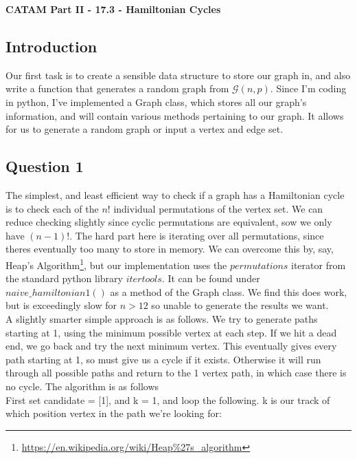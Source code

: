 \documentclass[10pt,a4paper]{report}
\begin{document}
\textbf{CATAM Part II - 17.3 - Hamiltonian Cycles}
\thispagestyle{empty}

\newpage

\subsection*{Introduction}

Our first task is to create a sensible data structure to store our graph in, and also write a function that generates a random graph from $\mathcal{G}(n,p)$. Since I'm coding in python, I've implemented a Graph class, which stores all our graph's information, and will contain various methods pertaining to our graph. It allows for us to generate a random graph or input a vertex and edge set.

\subsection*{Question 1}	

The simplest, and least efficient way to check if a graph has a Hamiltonian cycle is to check each of the $n!$ individual permutations of the vertex set. We can reduce checking slightly since cyclic permutations are equivalent, sow we only have $(n-1)!$. The hard part here is iterating over all permutations, since theres eventually too many to store in memory. We can overcome this by, say, Heap's Algorithm\footnote{\url{https://en.wikipedia.org/wiki/Heap\%27s_algorithm}}, but our implementation uses the $permutations$ iterator from the standard python library $itertools$.  It can be found under $naive\_hamiltonian1()$ as a method of the Graph class. We find this does work, but is exceedingly slow for $n>12$ so unable to generate the results we want. \\

A slightly smarter simple approach is as follows. We try to generate paths starting at 1, using the minimum possible vertex at each step. If we hit a dead end, we go back and try the next minimum vertex. This eventually gives every path starting at 1, so must give us a cycle if it exists. Otherwise it will run through all possible paths and return to the 1 vertex path, in which case there is no cycle. The algorithm is as follows\\
 
First set candidate = [1], and k = 1, and loop the following. k is our track of which position vertex in the path we're looking for:\\
\end{document}
